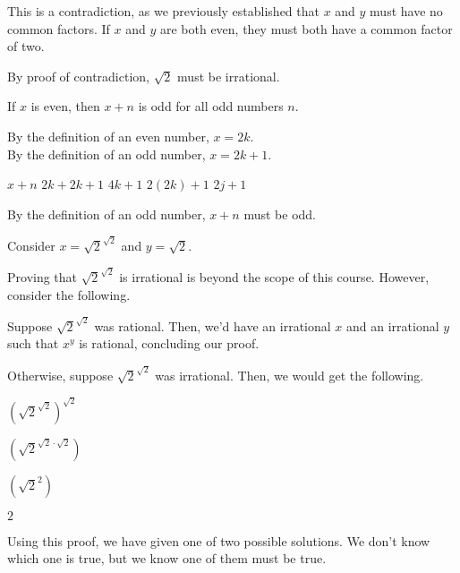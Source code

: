 \documentclass{exam}
\begin{document}
\begin{questions}
\begin{subparts}
\begin{center}
This is a contradiction, as we previously established that \(x\) and \(y\) must have no common factors. If \(x\) and \(y\) are both even, they must both have a common factor of two.

By proof of contradiction, \(\sqrt{2}\) must be irrational.

\end{center}

\subpart If \( x\) is even, then \(x+n\) is odd for all odd numbers \(n\).

\begin{center}

By the definition of an even number, \(x = 2k\).\\
By the definition of an odd number, \(x = 2k+1\).

\(x+n\)
\(2k + 2k + 1\)
\(4k + 1\)
\( 2(2k) + 1 \)
\( 2j + 1 \)

By the definition of an odd number, \(x+n\) must be odd.

\end{center}

\end{subparts}

\newpage


\begin{center}

Consider \(x = \sqrt{2}^{\sqrt{2}}\) and \(y = \sqrt{2} \).

Proving that \( \sqrt{2}^{\sqrt{2}} \) is irrational is beyond the scope of this course. However, consider the following.

Suppose \( \sqrt{2}^{\sqrt{2}} \) was rational. Then, we'd have an irrational \(x\) and an irrational \(y\) such that \(x^y\) is rational, concluding our proof.

Otherwise, suppose \( \sqrt{2}^{\sqrt{2}} \) was irrational. Then, we would get the following.

\((\sqrt{2}^{\sqrt{2}})^{\sqrt{2}} \)

\((\sqrt{2}^{\sqrt{2} \cdot \sqrt{2}}) \)

\((\sqrt{2}^{2}) \)

\( 2 \)

Using this proof, we have given one of two possible solutions. We don't know which one is true, but we know one of them must be true.


\end{center}
\end{questions}
\end{document}
